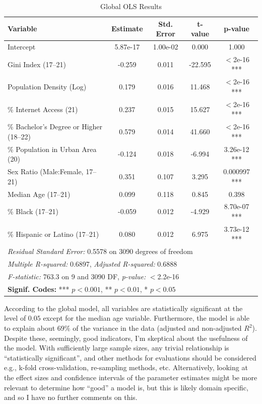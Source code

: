 \documentclass[
]{article}
\begin{document}
\begin{table}[H]
\renewcommand{\arraystretch}{1.5} %
\centering
\caption{Global OLS Results}
\label{tab:ols_results}
\begin{tabular}{lcccc}
\hline
\textbf{Variable} & \textbf{Estimate} & \textbf{Std. Error} & \textbf{t-value} & \textbf{p-value} \\ \hline
Intercept             & 5.87e-17       & 1.00e-02         & 0.000             & 1.000 \\ 
Gini Index (17–21)    & -0.259         & 0.011            & -22.595           & $<$2e-16 *** \\ 
Population Density (Log) & 0.179         & 0.016            & 11.468           & $<$2e-16 *** \\ 
\% Internet Access (21)  & 0.237         & 0.015            & 15.627           & $<$2e-16 *** \\ 
\% Bachelor's Degree or Higher (18–22) & 0.579 & 0.014   & 41.660           & $<$2e-16 *** \\ 
\% Population in Urban Area (20) & -0.124 & 0.018        & -6.994           & 3.26e-12 *** \\ 
Sex Ratio (Male:Female, 17–21) & 0.351   & 0.107          & 3.295            & 0.000997 *** \\ 
Median Age (17–21)     & 0.099         & 0.118            & 0.845            & 0.398 \\ 
\% Black (17–21)       & -0.059        & 0.012            & -4.929           & 8.70e-07 *** \\ 
\% Hispanic or Latino (17–21) & 0.080    & 0.012          & 6.975            & 3.73e-12 *** \\ 
\hline
\multicolumn{5}{l}{\textit{Residual Standard Error:} 0.5578 on 3090 degrees of freedom} \\
\multicolumn{5}{l}{\textit{Multiple R-squared:} 0.6897, \textit{Adjusted R-squared:} 0.6888} \\
\multicolumn{5}{l}{\textit{F-statistic:} 763.3 on 9 and 3090 DF, \textit{p-value:} $<$2.2e-16} \\
\hline
\multicolumn{5}{l}{\textbf{Signif. Codes:} *** $p < 0.001$, ** $p < 0.01$, * $p < 0.05$} \\
\end{tabular}
\end{table}

According to the global model, all variables are statistically
significant at the level of \(0.05\) except for the median age variable.
Furthermore, the model is able to explain about \(69\%\) of the variance
in the data (adjusted and non-adjusted \(R^{2}\)). Despite these,
seemingly, good indicators, I'm skeptical about the usefulness of the
model. With sufficiently large sample sizes, any trivial relationship is
``statistically significant'', and other methods for evaluations should
be considered e.g., k-fold cross-validation, re-sampling methods, etc.
Alternatively, looking at the effect sizes and confidence intervals of
the parameter estimates might be more relevant to determine how ``good''
a model is, but this is likely domain specific, and so I have no further
comments on this.
\end{document}
